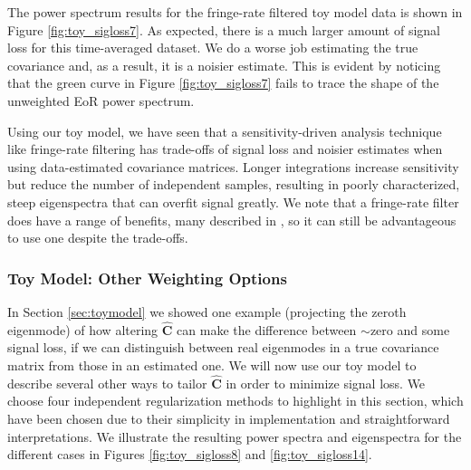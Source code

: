 \documentclass[preprint2,numberedappendix,tighten]{aastex6}  %
\begin{document}
The power spectrum results for the fringe-rate filtered toy model data is shown in Figure \ref{fig:toy_sigloss7}. As 
expected, there is a much larger amount of signal loss for this time-averaged dataset. We do a worse job estimating the true covariance and, as a result, it is a noisier estimate. This is evident by noticing that the 
green curve in Figure \ref{fig:toy_sigloss7} fails to trace the shape of the unweighted EoR power spectrum.

Using our toy model, we have seen that a sensitivity-driven analysis technique like fringe-rate filtering has trade-offs of signal 
loss and noisier estimates when using data-estimated covariance matrices. Longer integrations increase sensitivity but reduce 
the number of independent samples, resulting in poorly characterized, steep eigenspectra that can overfit signal greatly. We 
note that a fringe-rate filter does have a range of benefits, many described in \citet{parsons_et_al2016}, so it can still be 
advantageous to use one despite the trade-offs.

\subsubsection{Toy Model: Other Weighting Options}
\label{sec:otherweight}

In Section \ref{sec:toymodel} we showed one example (projecting the zeroth eigenmode) of how altering $\hat{\textbf{C}}$ can 
make the difference between $\sim$zero and some signal loss, if we can distinguish between real eigenmodes in a true covariance 
matrix from those in an estimated one. We will now use our toy model to describe several other ways to tailor $\hat{\textbf{C}}$ 
in order to minimize signal loss. We choose four independent regularization methods to highlight in this section, which have 
been chosen due to their simplicity in implementation and straightforward interpretations. We illustrate the resulting power 
spectra and eigenspectra for the different cases in Figures \ref{fig:toy_sigloss8} and \ref{fig:toy_sigloss14}.
\end{document}

